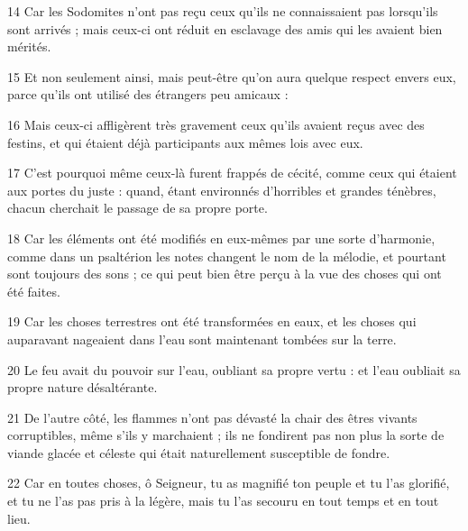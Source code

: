 \par 14 Car les Sodomites n'ont pas reçu ceux qu'ils ne connaissaient pas lorsqu'ils sont arrivés ; mais ceux-ci ont réduit en esclavage des amis qui les avaient bien mérités.
\par 15 Et non seulement ainsi, mais peut-être qu'on aura quelque respect envers eux, parce qu'ils ont utilisé des étrangers peu amicaux :
\par 16 Mais ceux-ci affligèrent très gravement ceux qu'ils avaient reçus avec des festins, et qui étaient déjà participants aux mêmes lois avec eux.
\par 17 C'est pourquoi même ceux-là furent frappés de cécité, comme ceux qui étaient aux portes du juste : quand, étant environnés d'horribles et grandes ténèbres, chacun cherchait le passage de sa propre porte.
\par 18 Car les éléments ont été modifiés en eux-mêmes par une sorte d'harmonie, comme dans un psaltérion les notes changent le nom de la mélodie, et pourtant sont toujours des sons ; ce qui peut bien être perçu à la vue des choses qui ont été faites.
\par 19 Car les choses terrestres ont été transformées en eaux, et les choses qui auparavant nageaient dans l'eau sont maintenant tombées sur la terre.
\par 20 Le feu avait du pouvoir sur l'eau, oubliant sa propre vertu : et l'eau oubliait sa propre nature désaltérante.
\par 21 De l'autre côté, les flammes n'ont pas dévasté la chair des êtres vivants corruptibles, même s'ils y marchaient ; ils ne fondirent pas non plus la sorte de viande glacée et céleste qui était naturellement susceptible de fondre.
\par 22 Car en toutes choses, ô Seigneur, tu as magnifié ton peuple et tu l'as glorifié, et tu ne l'as pas pris à la légère, mais tu l'as secouru en tout temps et en tout lieu.


